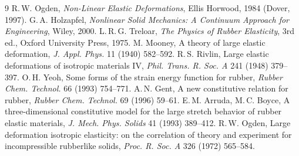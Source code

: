 \documentclass[11pt]{article}
\begin{document}
\small\begin{thebibliography}{9}
 R.\,W. Ogden, \emph{Non-Linear Elastic Deformations}, Ellis Horwood, 1984 (Dover, 1997).
 G.\,A. Holzapfel, \emph{Nonlinear Solid Mechanics: A Continuum Approach for Engineering}, Wiley, 2000.
 L.\,R.\,G. Treloar, \emph{The Physics of Rubber Elasticity}, 3rd ed., Oxford University Press, 1975.
 M. Mooney, A theory of large elastic deformation, \emph{J. Appl. Phys.} 11 (1940) 582--592.
 R.\,S. Rivlin, Large elastic deformations of isotropic materials IV, \emph{Phil. Trans. R. Soc. A} 241 (1948) 379--397.
 O.\,H. Yeoh, Some forms of the strain energy function for rubber, \emph{Rubber Chem. Technol.} 66 (1993) 754--771.
 A.\,N. Gent, A new constitutive relation for rubber, \emph{Rubber Chem. Technol.} 69 (1996) 59--61.
 E.\,M. Arruda, M.\,C. Boyce, A three-dimensional constitutive model for the large stretch behavior of rubber elastic materials, \emph{J. Mech. Phys. Solids} 41 (1993) 389--412.
 R.\,W. Ogden, Large deformation isotropic elasticity: on the correlation of theory and experiment for incompressible rubberlike solids, \emph{Proc. R. Soc. A} 326 (1972) 565--584.
\end{thebibliography}
\end{document}
